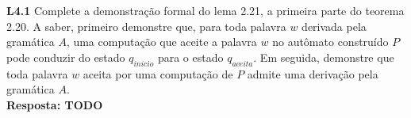 
\noindent \textbf{L4.1} Complete a demonstração formal do lema 2.21, a primeira parte do teorema 2.20. A saber, primeiro demonstre que, para toda palavra $w$ derivada pela gramática $A$, uma computação que aceite a palavra $w$ no autômato construído $P$ pode conduzir do estado $q_{inicio}$ para o estado $q_{aceita}$. Em seguida, demonstre que toda palavra $w$ aceita por uma computação de $P$ admite uma derivação pela gramática $A$. \\[3pt]
\textbf{Resposta: TODO}